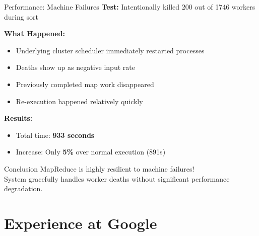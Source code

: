 \documentclass[aspectratio=169]{beamer}
\begin{document}
\begin{frame}{Performance: Machine Failures}
\textbf{Test:} Intentionally killed 200 out of 1746 workers during sort

\vspace{0.3cm}

\textbf{What Happened:}
\begin{itemize}
    \item Underlying cluster scheduler immediately restarted processes
    \item Deaths show up as negative input rate
    \item Previously completed map work disappeared
    \item Re-execution happened relatively quickly
\end{itemize}

\vspace{0.3cm}

\textbf{Results:}
\begin{itemize}
    \item Total time: \textbf{933 seconds}
    \item Increase: Only \textbf{5\%} over normal execution (891s)
\end{itemize}

\vspace{0.5cm}

\begin{exampleblock}{Conclusion}
MapReduce is highly resilient to machine failures! \\
System gracefully handles worker deaths without significant performance degradation.
\end{exampleblock}
\end{frame}

\section{Experience at Google}
\end{document}
